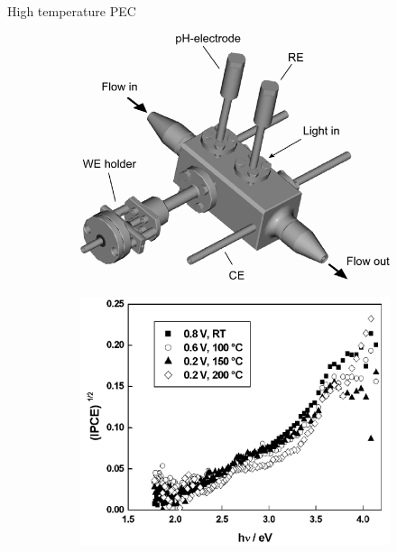 \documentclass[10pt,compress]{beamer}
\newcommand{\coef}{1}
\begin{document}
\begin{frame}[allowframebreaks=1.0]{High temperature PEC}
        \renewcommand{\coef}{0.45}
        \begin{figure}[h]
            \centering
            \begin{subfigure}{\coef\textwidth}
                \centering
                \includegraphics[width=\textwidth]{./src/figures/Bojinov_2002_Fig1.png}
                \caption{}
                \label{fig_bojinov_ht_a}
            \end{subfigure}
            \begin{subfigure}{\coef\textwidth}
                \centering
                \includegraphics[width=\textwidth]{./src/figures/Bojinov_2002_Fig5b.png}
                \caption{}
                \label{fig_bojinov_ht_b}
            \end{subfigure}
            

\end{figure}
\end{frame}
\end{document}
